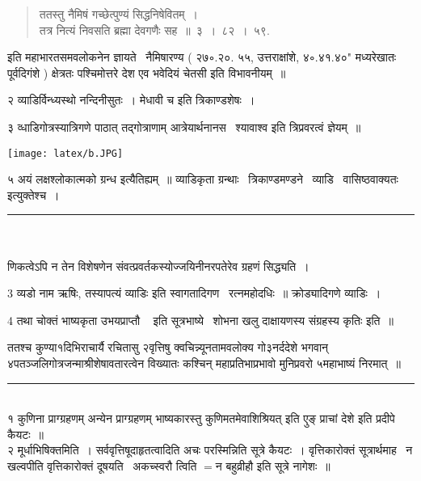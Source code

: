 \documentclass[11pt, openany]{book}
\makeatletter
\newcommand{\devanagarinumeral}[1]{
\devanagaridigits{\number \csname c@#1\endcsname}} %
\makeatother
\begin{document}
\begin{multicols}{2}
\begin{quote}
{ततस्तु नैमिषं गच्छेत्पुण्यं सिद्धनिषेवितम्~।\\
तत्र नित्यं निवसति ब्रह्मा देवगणैः सह~॥~३~।~८२~।~५९.}
\end{quote}

इति महाभारतसमवलोकनेन ज्ञायते \textendash\ नैमिषारण्य ( २७∘.२०. ५५, उत्तराक्षांशे, ४∘.४१.४०" मध्यरेखातः पूर्वदिगंशे ) क्षेत्रतः पश्चिमोत्तरे देश एव भवेदियं चेतसी इति विभावनीयम्~॥

२ व्याडिर्विन्ध्यस्थो नन्दिनीसुतः~। मेधावी च इति त्रिकाण्डशेषः~। 

३ व्धाडिगोत्रस्यात्रिगणे पाठात् तद्गोत्राणाम् आत्रेयार्थनानस \textendash\ श्यावाश्व इति त्रिप्रवरत्वं ज्ञेयम्~॥

\texttt{[image: latex/b.JPG]}

५ अयं लक्षश्लोकात्मको ग्रन्ध इत्यैतिह्यम्~॥ व्याडिकृता ग्रन्थाः \textendash\ त्रिकाण्डमण्डने \textendash\ व्याडि \textendash\ वासिष्ठवाक्यतः इत्युक्तेश्च~।

\noindent
\rule{1\linewidth}{0.5pt}\\\\
णिकत्वेऽपि न तेन विशेषणेन संवत्प्रवर्तकस्योज्जयिनीनरपतेरेव ग्रहणं सिद्ध्यति~।

3 {\qt व्यडो नाम ऋषिः,} तस्यापत्यं व्याडिः इति स्वागतादिगण \textendash\ रत्नमहोदधिः~॥ क्रोड्यादिगणे {\qt व्याडिः}~।

4 तथा चोक्तं भाष्यकृता {\qt उभयप्राप्तौ \textendash\ } इति सूत्रभाष्ये \textendash\ {\qt शोभना खलु दाक्षायणस्य संग्रहस्य कृतिः} इति~॥
\end{multicols}

\fancyhead[RO,LE]{\thepage}
\cfoot{}
\newpage
\renewcommand{\thepage}{\devanagarinumeral{page}}
\setcounter{page}{11}


ततश्च कुण्या१दिभिराचार्यै रचितासु २वृत्तिषु क्वचिन्न्यूनतामवलोक्य गो३नर्ददेशे भगवान् ४पतञ्जलिगोत्रजन्माश्रीशेषावतारत्वेन विख्यातः कश्चिन् महाप्रतिभाप्रभावो मुनिप्रवरो ५महाभाष्यं निरमात्~॥\\
\rule{1\linewidth}{0.5pt}\\

१ {\qt कुणिना प्राग्ग्रहणम् अन्येन प्राग्ग्रहणम् भाष्यकारस्तु
कुणिमतमेवाशिश्रियत्} इति {\qt एुङ् प्राचां देशे } इति प्रदीपे कैयटः~॥\\

२ {\qt मूर्धाभिषिक्तमिति~। सर्ववृत्तिषूदाहृतत्वादिति अचः परस्मिन्निति सूत्रे कैयटः~। }वृत्तिकारोक्तं सूत्रार्थमाह \textendash\ न खल्वपीति वृत्तिकारोक्तं दूषयति \textendash\ अकच्स्वरौ त्विति $=$न बहुव्रीहौ इति सूत्रे नागेशः~॥\\
\end{document}
